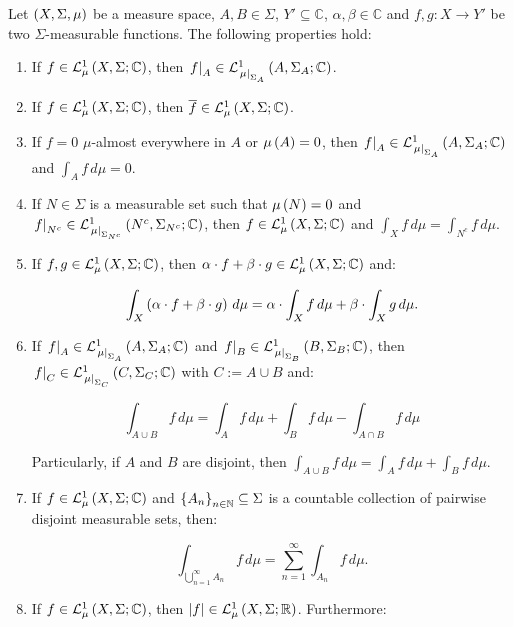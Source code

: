 \begin{proposition}
  Let $\pr{X,\Sigma,\mu}$ be a measure space, $A,B\in\Sigma$, $Y'\subseteq\mathbb{C}$, $\alpha,\beta\in\mathbb{C}$ and $f,g:X\rightarrow Y'$ be two $\Sigma$-measurable functions. The following properties hold:

  \begin{enumerate}
    \item If $f\in\LebC{X}{\Sigma}{\mu}$, then $\rest{f}{A}\in\LebC{A}{\Sigma_A}{\rest{\mu}{\Sigma_A}}$.
    \item If $f\in\LebC{X}{\Sigma}{\mu}$, then $\overline{f}\in\LebC{X}{\Sigma}{\mu}$.
    \item If $f=0$ $\mu$-almost everywhere in $A$ or $\mu\pr{A}=0$, then $\rest{f}{A}\in\LebC{A}{\Sigma_A}{\rest{\mu}{\Sigma_A}}$ and $\int_{A}{f\,d\mu}=0$.
    \item If $N\in\Sigma$ is a measurable set such that $\mu\pr{N}=0$ and $\rest{f}{N^c}\in\LebC{N^c}{\Sigma_{N^c}}{\rest{\mu}{\Sigma_{N^c}}}$, then $f\in\LebC{X}{\Sigma}{\mu}$ and $\int_{X}{f\,d\mu}=\int_{N^c}{f\,d\mu}$.
    \item If $f,g\in\LebC{X}{\Sigma}{\mu}$, then $\alpha\cdot f+\beta\cdot g\in\LebC{X}{\Sigma}{\mu}$ and:
    
    \begin{equation}
      \int_{X}{\pr{\alpha\cdot f+\beta\cdot g}\,d\mu}=\alpha\cdot\int_{X}{f\,d\mu}+\beta\cdot\int_{X}{g\,d\mu}.
    \end{equation}
    \item If $\rest{f}{A}\in\LebC{A}{\Sigma_A}{\rest{\mu}{\Sigma_A}}$ and $\rest{f}{B}\in\LebC{B}{\Sigma_{B}}{\rest{\mu}{\Sigma_B}}$, then $\rest{f}{C}\in\LebC{C}{\Sigma_{C}}{\rest{\mu}{\Sigma_C}}$ with $C:=A\cup B$ and:
    
    \begin{equation}
      \int_{A\cup B}{f\,d\mu}=\int_{A}{f\,d\mu}+\int_{B}{f\,d\mu}-\int_{A\cap B}{f\,d\mu}
    \end{equation}

    Particularly, if $A$ and $B$ are disjoint, then $\int_{A\cup B}{f\,d\mu}=\int_{A}{f\,d\mu}+\int_{B}{f\,d\mu}$.

    \item If $f\in\LebC{X}{\Sigma}{\mu}$ and $\set{A_n}_{n\in\mathbb{N}}\subseteq\Sigma$ is a countable collection of pairwise disjoint measurable sets, then:
    

    \begin{equation}
      \int_{\bigcup_{n=1}^{\infty}{A_n}}{f\,d\mu}=\sum_{n=1}^{\infty}{\int_{A_n}{f\,d\mu}}.
    \end{equation}
    \item If $f\in\LebC{X}{\Sigma}{\mu}$, then $\bars{f}\in\LebR{X}{\Sigma}{\mu}$. Furthermore:
    

\end{enumerate}
\end{proposition}
